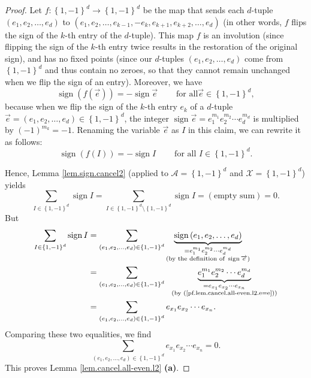\begin{proof}
Let $f:\left\{  1,-1\right\}  ^{d}\rightarrow\left\{  1,-1\right\}  ^{d}$ be
the map that sends each $d$-tuple $\left(  e_{1},e_{2},\ldots,e_{d}\right)  $
to $\left(  e_{1},e_{2},\ldots,e_{k-1},-e_{k},e_{k+1},e_{k+2},\ldots
,e_{d}\right)  $ (in other words, $f$ flips the sign of the $k$-th entry of
the $d$-tuple). This map $f$ is an involution (since flipping the sign of the
$k$-th entry twice results in the restoration of the original sign), and has
no fixed points (since our $d$-tuples $\left(  e_{1},e_{2},\ldots
,e_{d}\right)  $ come from $\left\{  1,-1\right\}  ^{d}$ and thus contain no
zeroes, so that they cannot remain unchanged when we flip the sign of an
entry). Moreover, we have%
\[
\operatorname*{sign}\left(  f\left(  \overrightarrow{e}\right)  \right)
=-\operatorname*{sign}\overrightarrow{e}\ \ \ \ \ \ \ \ \ \ \text{for all
}\overrightarrow{e}\in\left\{  1,-1\right\}  ^{d},
\]
because when we flip the sign of the $k$-th entry $e_{k}$ of a $d$-tuple
$\overrightarrow{e}=\left(  e_{1},e_{2},\ldots,e_{d}\right)  \in\left\{
1,-1\right\}  ^{d}$, the integer $\operatorname*{sign}\overrightarrow{e}%
=e_{1}^{m_{1}}e_{2}^{m_{2}}\cdots e_{d}^{m_{d}}$ is multiplied by $\left(
-1\right)  ^{m_{k}}=-1$. Renaming the variable $\overrightarrow{e}$ as $I$ in
this claim, we can rewrite it as follows:%
\[
\operatorname*{sign}\left(  f\left(  I\right)  \right)  =-\operatorname*{sign}%
I\ \ \ \ \ \ \ \ \ \ \text{for all }I\in\left\{  1,-1\right\}  ^{d}.
\]


Hence, Lemma \ref{lem.sign.cancel2} (applied to $\mathcal{A}=\left\{
1,-1\right\}  ^{d}$ and $\mathcal{X}=\left\{  1,-1\right\}  ^{d}$) yields%
\[
\sum_{I\in\left\{  1,-1\right\}  ^{d}}\operatorname*{sign}I=\sum_{I\in\left\{
1,-1\right\}  ^{d}\setminus\left\{  1,-1\right\}  ^{d}}\operatorname*{sign}%
I=\left(  \text{empty sum}\right)  =0.
\]
But%
\begin{align*}
\sum_{I\in\left\{  1,-1\right\}  ^{d}}\operatorname*{sign}I  &  =\sum_{\left(
e_{1},e_{2},\ldots,e_{d}\right)  \in\left\{  1,-1\right\}  ^{d}}%
\underbrace{\operatorname*{sign}\left(  e_{1},e_{2},\ldots,e_{d}\right)
}_{\substack{=e_{1}^{m_{1}}e_{2}^{m_{2}}\cdots e_{d}^{m_{d}}\\\text{(by the
definition of }\operatorname*{sign}\overrightarrow{e}\text{)}}}\\
&  =\sum_{\left(  e_{1},e_{2},\ldots,e_{d}\right)  \in\left\{  1,-1\right\}
^{d}}\ \ \underbrace{e_{1}^{m_{1}}e_{2}^{m_{2}}\cdots e_{d}^{m_{d}}%
}_{\substack{=e_{x_{1}}e_{x_{2}}\cdots e_{x_{n}}\\\text{(by
(\ref{pf.lem.cancel.all-even.l2.e=e}))}}}\\
&  =\sum_{\left(  e_{1},e_{2},\ldots,e_{d}\right)  \in\left\{  1,-1\right\}
^{d}}e_{x_{1}}e_{x_{2}}\cdots e_{x_{n}}.
\end{align*}
Comparing these two equalities, we find
\[
\sum_{\left(  e_{1},e_{2},\ldots,e_{d}\right)  \in\left\{  1,-1\right\}  ^{d}%
}e_{x_{1}}e_{x_{2}}\cdots e_{x_{n}}=0.
\]
This proves Lemma \ref{lem.cancel.all-even.l2} \textbf{(a)}. \medskip


\end{proof}
